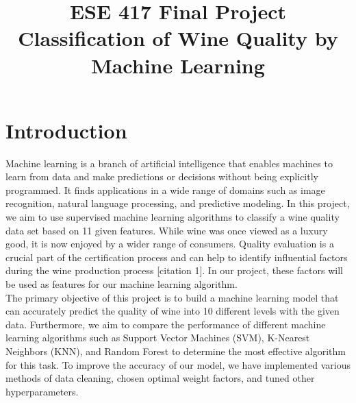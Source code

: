 \documentclass[conference]{IEEEtran}
\begin{document}
\title{ESE 417 Final Project Classification of Wine Quality by Machine Learning}

\author{
\and
{}
\and
{}
}

\maketitle
\section{Introduction}
Machine learning is a branch of artificial intelligence that enables machines to learn from data and make predictions or decisions without being explicitly programmed. It finds applications in a wide range of domains such as image recognition, natural language processing, and predictive modeling. In this project, we aim to use supervised machine learning algorithms to classify a wine quality data set based on 11 given features. While wine was once viewed as a luxury good, it is now enjoyed by a wider range of consumers. Quality evaluation is a crucial part of the certification process and can help to identify influential factors during the wine production process [citation 1]. In our project, these factors will be used as features for our machine learning algorithm.\\

The primary objective of this project is to build a machine learning model that can accurately predict the quality of wine into 10 different levels with the given data. Furthermore, we aim to compare the performance of different machine learning algorithms such as Support Vector Machines (SVM), K-Nearest Neighbors (KNN), and Random Forest to determine the most effective algorithm for this task. To improve the accuracy of our model, we have implemented various methods of data cleaning, chosen optimal weight factors, and tuned other hyperparameters. \\
\end{document}
